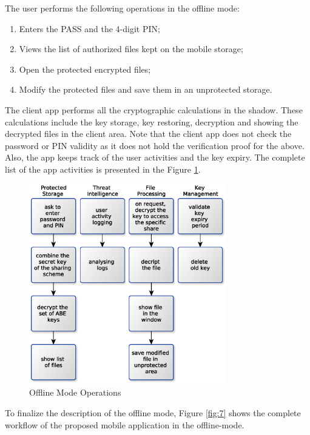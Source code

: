 \documentclass[twocolumn]{svjour3}          %
\begin{document}
The user performs the following operations in the offline mode:

\begin{enumerate}
	\item Enters the PASS and the 4-digit PIN;
	\item Views the list of authorized files kept on the mobile storage;
	\item Open the protected encrypted files;
	\item Modify the protected files and save them in an unprotected storage.
\end{enumerate}

The client app performs all the cryptographic calculations in the shadow. These calculations include the key storage, key restoring, decryption and showing the decrypted files in the client area. Note that the client app does not check the password or PIN validity as it does not hold the verification proof for the above. Also, the app keeps track of the user activities and the key expiry. The complete list of the app activities is presented in the Figure \ref{fig:6}.

\begin{figure}[h!]
	\centering
	\includegraphics[width=8.6cm]{figures/offlinemodeoperations.eps}
	\caption{Offline Mode Operations}
	\label{fig:6}
\end{figure}

To finalize the description of the offline mode, Figure \ref{fig:7} shows the complete workflow of the proposed mobile application in the offline-mode.
\end{document}

